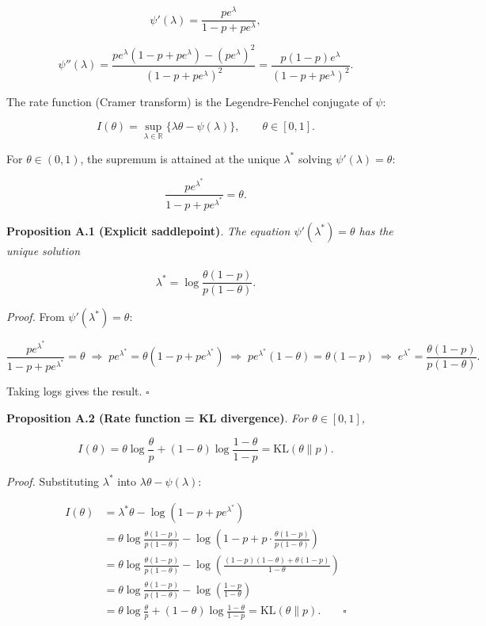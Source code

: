 \documentclass[
  12pt,
]{article}
\begin{document}
\[\psi'(\lambda) = \frac{p e^\lambda}{1-p + p e^\lambda},\]

\[\psi''(\lambda) = \frac{p e^\lambda (1-p + p e^\lambda) - (p e^\lambda)^2}{(1-p + p e^\lambda)^2}
= \frac{p(1-p)e^\lambda}{(1-p + p e^\lambda)^2}.\]

The rate function (Cramer transform) is the Legendre-Fenchel conjugate
of \(\psi\):

\[I(\theta) = \sup_{\lambda \in \mathbb{R}} \{\lambda\theta - \psi(\lambda)\}, \qquad \theta \in [0,1].\]

For \(\theta \in (0,1)\), the supremum is attained at the unique
\(\lambda^*\) solving \(\psi'(\lambda) = \theta\):

\[\frac{p e^{\lambda^*}}{1-p + p e^{\lambda^*}} = \theta.\]

\textbf{Proposition A.1 (Explicit saddlepoint)}. \emph{The equation
\(\psi'(\lambda^*) = \theta\) has the unique solution}

\[\lambda^* = \log\frac{\theta(1-p)}{p(1-\theta)}.\]

\emph{Proof.} From \(\psi'(\lambda^*) = \theta\):

\[
\frac{p e^{\lambda^*}}{1-p + p e^{\lambda^*}} = \theta
\;\Longrightarrow\; p e^{\lambda^*} = \theta(1-p + p e^{\lambda^*})
\;\Longrightarrow\; p e^{\lambda^*}(1-\theta) = \theta(1-p)
\;\Longrightarrow\; e^{\lambda^*} = \frac{\theta(1-p)}{p(1-\theta)}.
\]

Taking logs gives the result. \(\square\)

\textbf{Proposition A.2 (Rate function = KL divergence)}. \emph{For
\(\theta \in [0,1]\),}

\[I(\theta) = \theta\log\frac{\theta}{p} + (1-\theta)\log\frac{1-\theta}{1-p} = \text{KL}(\theta \| p).\]

\emph{Proof.} Substituting \(\lambda^*\) into
\(\lambda\theta - \psi(\lambda)\):

\[
\begin{aligned}
I(\theta) &= \lambda^*\theta - \log(1-p + p e^{\lambda^*}) \\
&= \theta\log\frac{\theta(1-p)}{p(1-\theta)} - \log\!\left(1-p + p\cdot\frac{\theta(1-p)}{p(1-\theta)}\right) \\
&= \theta\log\frac{\theta(1-p)}{p(1-\theta)} - \log\!\left(\frac{(1-p)(1-\theta) + \theta(1-p)}{1-\theta}\right) \\
&= \theta\log\frac{\theta(1-p)}{p(1-\theta)} - \log\!\left(\frac{1-p}{1-\theta}\right) \\
&= \theta\log\frac{\theta}{p} + (1-\theta)\log\frac{1-\theta}{1-p} = \text{KL}(\theta \| p). \qquad \square
\end{aligned}
\]
\end{document}
